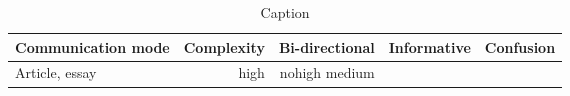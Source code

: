 \begin{table*}\centering
{}
\begin{tabular}{@{}lrrrr@{}}\toprule
Communication mode & Complexity & Bi-directional & Informative  & Confusion
\\\midrule
Article, essay & high & nohigh
medium
 \\

\bottomrule
\end{tabular}
\caption{Caption}
\end{table*}